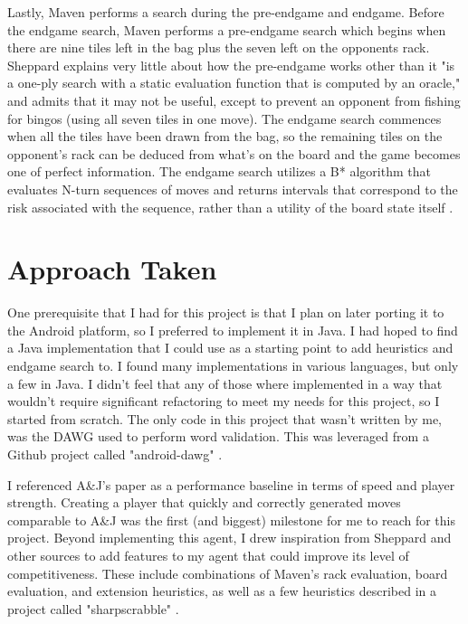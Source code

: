 \documentclass[letterpaper]{article}
\begin{document}
Lastly, Maven performs a search during the pre-endgame and endgame. Before the endgame search, Maven performs a pre-endgame search which begins when there are nine tiles left in the bag plus the seven left on the opponents rack. Sheppard explains very little about how the pre-endgame works other than it "is a one-ply search with a static evaluation function that is computed by an oracle," and admits that it may not be useful, except to prevent an opponent from fishing for bingos (using all seven tiles in one move). The endgame search commences when all the tiles have been drawn from the bag, so the remaining tiles on the opponent's rack can be deduced from what's on the board and the game becomes one of perfect information. The endgame search utilizes a B* algorithm that evaluates N-turn sequences of moves and returns intervals that correspond to the risk associated with the sequence, rather than a utility of the board state itself \cite{1sheppard2002}.

\section{Approach Taken}
One prerequisite that I had for this project is that I plan on later porting it to the Android platform, so I preferred to implement it in Java. I had hoped to find a Java implementation that I could use as a starting point to add heuristics and endgame search to. I found many implementations in various languages, but only a few in Java. I didn't feel that any of those where implemented in a way that wouldn't require significant refactoring to meet my needs for this project, so I started from scratch. The only code in this project that wasn't written by me, was the DAWG used to perform word validation. This was leveraged from a Github project called "android-dawg" \cite{icantrap}.

I referenced A\&J's paper as a performance baseline in terms of speed and player strength. Creating a player that quickly and correctly generated moves comparable to A\&J was the first (and biggest) milestone for me to reach for this project. Beyond implementing this agent, I drew inspiration from Sheppard and other sources to add features to my agent that could improve its level of competitiveness. These include combinations of Maven's rack evaluation, board evaluation, and extension heuristics, as well as a few heuristics described in a project called "sharpscrabble" \cite{sharpscrabble}.
\end{document}
